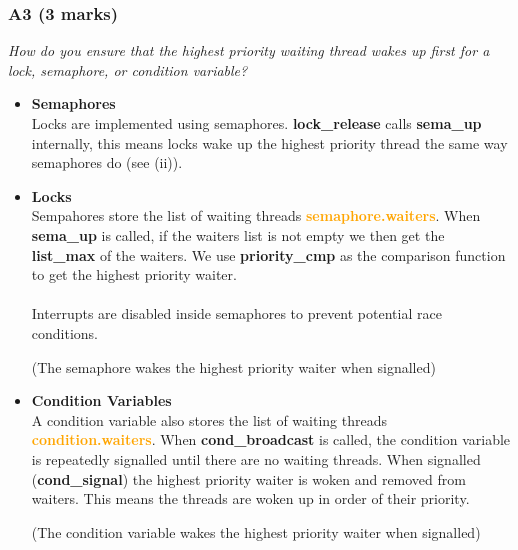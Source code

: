 \documentclass{report}
\newcommand{\question}[1]{\textit{#1} \\ }
\newcommand{\bullpara}[2]{\item \textbf{#1} \ #2}
\newcommand{\fun}[1]{\textcolor{Emerald}{\textbf{#1}}}
\newcommand{\file}[1]{\textcolor{YellowGreen}{\textbf{#1}}}
\newcommand{\struct}[1]{\textcolor{orange}{\textbf{#1}}}
\newcommand{\pintoscode}[4]{}
\begin{document}
                \subsubsection*{A3  (3 marks) }
                    \question{How do you ensure that the highest priority waiting thread wakes up first for a lock, semaphore, or condition variable?}
                        \begin{itemize}
                            \bullpara{Semaphores}{
                                \\ Locks are implemented using semaphores. \fun{lock\_release} calls \fun{sema\_up} internally,
                                this means locks wake up the highest priority thread the same way semaphores do (see (ii)).
                            }
                            \bullpara{Locks}{
                                \\ Sempahores store the list of waiting threads \struct{semaphore.waiters}. When \fun{sema\_up} 
                                is called, if the waiters list is not empty we then get the \fun{list\_max} of the waiters. 
                                We use \fun{priority\_cmp} as the comparison function to get the highest priority waiter.
                                \\
                                \\ Interrupts are disabled inside semaphores to prevent potential race conditions.
                                \pintoscode{118}{124}{synch.c}{synch.c}
                                (The semaphore wakes the highest priority waiter when signalled)
                            }
                            \bullpara{Condition Variables}{
                               \\A condition variable also stores the list of waiting threads \struct{condition.waiters}. 
                               When \fun{cond\_broadcast} is called, the condition variable is repeatedly signalled until 
                               there are no waiting threads. When signalled (\fun{cond\_signal}) the highest priority 
                               waiter is woken and removed from waiters. This means the threads are woken up in order of 
                               their priority.
                                \pintoscode{334}{339}{synch.c}{synch.c}
                                (The condition variable wakes the highest priority waiter when signalled)
                            }
                        \end{itemize}
\end{document}
